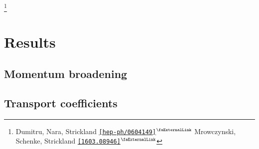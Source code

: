 \documentclass[aspectratio=169,11pt,usenames,dvipsnames]{beamer}
\renewcommand{\thefootnote}{\color{customblue}\faPaperPlaneO}
\newcommand\blfootnote[1]{%
  \begingroup
  \renewcommand\thefootnote{}\footnote{#1}%
  \addtocounter{footnote}{-1}%
  \endgroup
}
\begin{document}
\begin{frame}

    \blfootnote{\scriptsize Dumitru, Nara, Strickland \href{https://arxiv.org/abs/hep-ph/0604149}{{\color{palgold}\texttt{[hep-ph/0604149]}$^\text{\scalebox{0.9}{\faExternalLink}}$}} Mrowczynski, Schenke, Strickland \href{https://arxiv.org/abs/1603.08946}{{\color{palgold}\texttt{[1603.08946]}$^\text{\scalebox{0.9}{\faExternalLink}}$}}}
\end{frame}



\section{Results}


\subsection{Momentum broadening}


\subsection{Transport coefficients}
\end{document}
